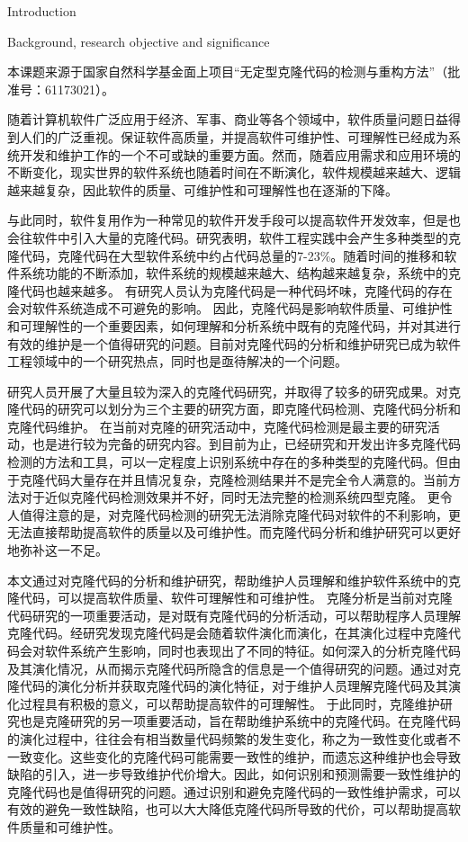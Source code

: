 
{Introduction}

{Background, research objective and significance}

本课题来源于国家自然科学基金面上项目“无定型克隆代码的检测与重构方法”（批准号：61173021）。

随着计算机软件广泛应用于经济、军事、商业等各个领域中，软件质量问题日益得到人们的广泛重视。保证软件高质量，并提高软件可维护性、可理解性已经成为系统开发和维护工作的一个不可或缺的重要方面。然而，随着应用需求和应用环境的不断变化，现实世界的软件系统也随着时间在不断演化，软件规模越来越大、逻辑越来越复杂，因此软件的质量、可维护性和可理解性也在逐渐的下降。

与此同时，软件复用作为一种常见的软件开发手段可以提高软件开发效率，但是也会往软件中引入大量的克隆代码。研究表明，软件工程实践中会产生多种类型的克隆代码，克隆代码在大型软件系统中约占代码总量的7-23\%\cite{roy2007survey}。随着时间的推移和软件系统功能的不断添加，软件系统的规模越来越大、结构越来越复杂，系统中的克隆代码也越来越多。
有研究人员认为克隆代码是一种代码坏味\cite{fowler2009refactoring}，克隆代码的存在会对软件系统造成不可避免的影响。
因此，克隆代码是影响软件质量、可维护性和可理解性的一个重要因素，如何理解和分析系统中既有的克隆代码，并对其进行有效的维护是一个值得研究的问题。目前对克隆代码的分析和维护研究已成为软件工程领域中的一个研究热点，同时也是亟待解决的一个问题。

研究人员开展了大量且较为深入的克隆代码研究，并取得了较多的研究成果。对克隆代码的研究可以划分为三个主要的研究方面，即克隆代码检测、克隆代码分析和克隆代码维护。
在当前对克隆的研究活动中，克隆代码检测是最主要的研究活动，也是进行较为完备的研究内容。到目前为止，已经研究和开发出许多克隆代码检测的方法和工具，可以一定程度上识别系统中存在的多种类型的克隆代码。但由于克隆代码大量存在并且情况复杂，克隆检测结果并不是完全令人满意的。当前方法对于近似克隆代码检测效果并不好，同时无法完整的检测系统四型克隆。
更令人值得注意的是，对克隆代码检测的研究无法消除克隆代码对软件的不利影响，更无法直接帮助提高软件的质量以及可维护性。而克隆代码分析和维护研究可以更好地弥补这一不足。

本文通过对克隆代码的分析和维护研究，帮助维护人员理解和维护软件系统中的克隆代码，可以提高软件质量、软件可理解性和可维护性。
克隆分析是当前对克隆代码研究的一项重要活动，是对既有克隆代码的分析活动，可以帮助程序人员理解克隆代码。经研究发现克隆代码是会随着软件演化而演化，在其演化过程中克隆代码会对软件系统产生影响，同时也表现出了不同的特征。如何深入的分析克隆代码及其演化情况，从而揭示克隆代码所隐含的信息是一个值得研究的问题。通过对克隆代码的演化分析并获取克隆代码的演化特征，对于维护人员理解克隆代码及其演化过程具有积极的意义，可以帮助提高软件的可理解性。
于此同时，克隆维护研究也是克隆研究的另一项重要活动，旨在帮助维护系统中的克隆代码。在克隆代码的演化过程中，往往会有相当数量代码频繁的发生变化，称之为一致性变化或者不一致变化。这些变化的克隆代码可能需要一致性的维护，而遗忘这种维护也会导致缺陷的引入，进一步导致维护代价增大。因此，如何识别和预测需要一致性维护的克隆代码也是值得研究的问题。通过识别和避免克隆代码的一致性维护需求，可以有效的避免一致性缺陷，也可以大大降低克隆代码所导致的代价，可以帮助提高软件质量和可维护性。

